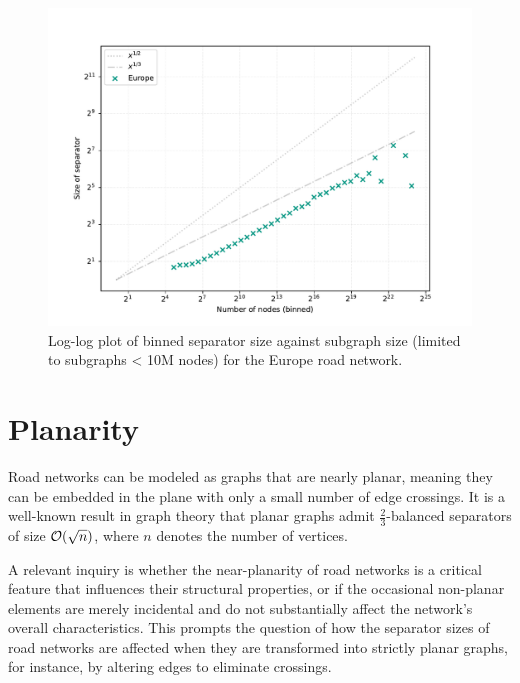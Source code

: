 \begin{figure}
	\centering
    \includegraphics[width=0.7\linewidth]{graphics/Europe-binned.pdf}
	\caption{Log-log plot of binned separator size against subgraph size (limited to subgraphs < 10M nodes) for the Europe road network.}
	\label{fig:separator_size_loglog_binned}
\end{figure}


\section{Planarity} \label{sec:approach:planarity}

Road networks can be modeled as graphs that are nearly planar, meaning they can
be embedded in the plane with only a small number of edge crossings. It is a
well-known result in graph theory that planar graphs admit \(\frac23\)-balanced
separators of size \(\mathcal{O}\!\left(\sqrt{n}\right)\), where \(n\) denotes the number of
vertices.

A relevant inquiry is whether the near-planarity of road networks is a critical
feature that influences their structural properties, or if the occasional
non-planar elements are merely incidental and do not substantially affect the
network’s overall characteristics. This prompts the question of how the
separator sizes of road networks are affected when they are transformed into
strictly planar graphs, for instance, by altering edges to eliminate crossings.


